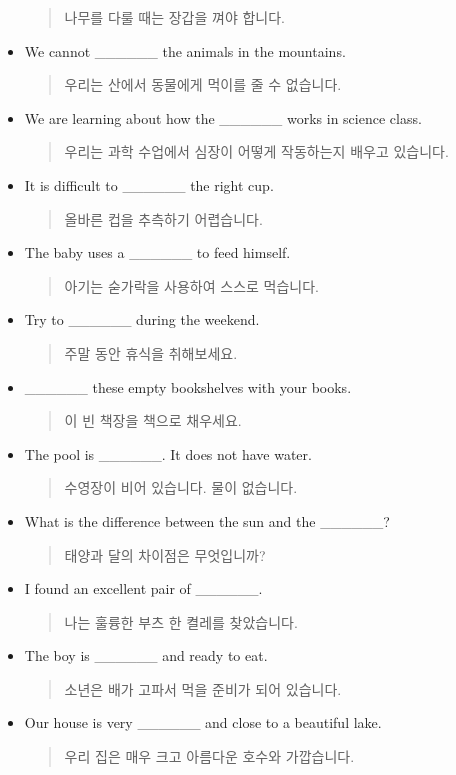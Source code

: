 \documentclass{article}
\begin{document}
\begin{addmargin}[1em]{1em}
\begin{itemize}
    \begin{quote}
    나무를 다룰 때는 장갑을 껴야 합니다.
    \end{quote}
    \item We cannot \_\_\_\_\_\_ the animals in the mountains.
    \begin{quote}
    우리는 산에서 동물에게 먹이를 줄 수 없습니다.
    \end{quote}
    \item We are learning about how the \_\_\_\_\_\_ works in science class.
    \begin{quote}
    우리는 과학 수업에서 심장이 어떻게 작동하는지 배우고 있습니다.
    \end{quote}
    \item It is difficult to \_\_\_\_\_\_ the right cup.
    \begin{quote}
    올바른 컵을 추측하기 어렵습니다.
    \end{quote}
    \item The baby uses a \_\_\_\_\_\_ to feed himself.
    \begin{quote}
    아기는 숟가락을 사용하여 스스로 먹습니다.
    \end{quote}
    \newpage
    \item Try to \_\_\_\_\_\_ during the weekend.
    \begin{quote}
    주말 동안 휴식을 취해보세요.
    \end{quote}
    \item \_\_\_\_\_\_ these empty bookshelves with your books.
    \begin{quote}
    이 빈 책장을 책으로 채우세요.
    \end{quote}
    \item The pool is \_\_\_\_\_\_. It does not have water.
    \begin{quote}
    수영장이 비어 있습니다. 물이 없습니다.
    \end{quote}
    \item What is the difference between the sun and the \_\_\_\_\_\_?
    \begin{quote}
    태양과 달의 차이점은 무엇입니까?
    \end{quote}
    \item I found an excellent pair of \_\_\_\_\_\_.
    \begin{quote}
    나는 훌륭한 부츠 한 켤레를 찾았습니다.
    \end{quote}
    \item The boy is \_\_\_\_\_\_ and ready to eat.
    \begin{quote}
    소년은 배가 고파서 먹을 준비가 되어 있습니다.
    \end{quote}
    \item Our house is very \_\_\_\_\_\_ and close to a beautiful lake.
    \begin{quote}
    우리 집은 매우 크고 아름다운 호수와 가깝습니다.
    \end{quote}
\end{itemize}
\end{addmargin}
\newpage
\end{document}
